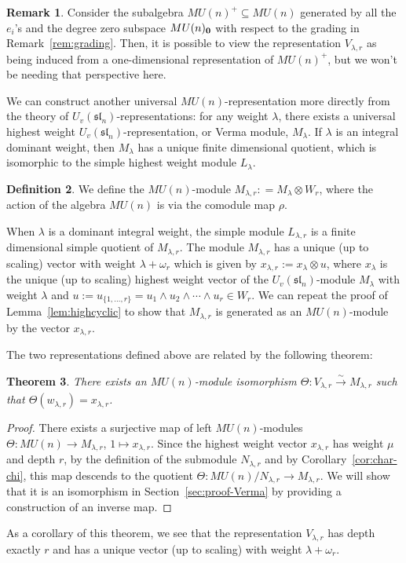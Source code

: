 \documentclass{amsart}
\numberwithin{equation}{section}
\theoremstyle{theorem}
\newtheorem{theorem}{Theorem}[section]
\theoremstyle{definition}
\newtheorem{remark}[theorem]{Remark}
\newtheorem{definition}[theorem]{Definition}
\newcommand{\sub}{\subseteq}
\newcommand{\sll}{\mathfrak{sl}}
\newcommand{\xra}{\xrightarrow[]}
\newcommand{\uvsln}{U_v(\sll_n)}
\begin{document}
\begin{remark}
Consider the subalgebra $MU(n)^+\sub MU(n)$ generated by all the $e_i$'s and the degree zero subspace $MU(n)_{\bold{0}}$ with respect to the grading in Remark~\ref{rem:grading}. Then, it is possible to view the representation $V_{\lambda, r}$ as being induced from a one-dimensional representation of $MU(n)^+$, but we won't be needing that perspective here.
\end{remark}

We can construct another universal $MU(n)$-representation more directly from the theory of $\uvsln$-representations: for any weight $\lambda$, there exists a universal highest weight $\uvsln$-representation, or Verma module, $M_{\lambda}$. If $\lambda$ is an integral dominant weight, then $M_{\lambda}$ %
has a unique finite dimensional quotient, which is isomorphic to %
the simple highest weight module $L_{\lambda}$.%

\begin{definition}
We define the $MU(n)$-module $M_{\lambda,r}: = M_{\lambda} \otimes W_r$, where the action of the algebra $MU(n)$ is via the comodule map $\rho$.
\end{definition}
When $\lambda$ is a dominant integral weight, the simple module $L_{\lambda, r}$ is a finite dimensional simple quotient of $M_{\lambda,r}$. The module $M_{\lambda,r}$ has a unique (up to scaling) vector with weight $\lambda+\omega_r$ which is given by $x_{\lambda,r}:=x_{\lambda}\otimes u$, where $x_{\lambda}$ is the unique (up to scaling) highest weight vector of the $\uvsln$-module $M_{\lambda}$ with weight $\lambda$ and $u:=u_{\{1,\ldots,r\}}=u_1\wedge u_2\wedge\cdots\wedge u_r \in W_r$. We can repeat the proof of Lemma~\ref{lem:highcyclic} to show that $M_{\lambda,r}$ is generated as an $MU(n)$-module by the vector $x_{\lambda,r}$.

The two representations defined above are related by the following theorem:
\begin{theorem} \label{prop:Verma}
There exists an $MU(n)$-module isomorphism $\Theta: V_{\lambda,r} \xra{\sim} M_{\lambda,r}$ such that $\Theta(w_{\lambda,r})=x_{\lambda,r}$.
\end{theorem}
\begin{proof}
There exists a surjective map of left $MU(n)$-modules $\Theta:MU(n)\to M_{\lambda,r}$, $1\mapsto x_{\lambda,r}$. Since the highest weight vector $x_{\lambda,r}$ has weight $\mu$ and depth $r$, by the definition of the submodule $N_{\lambda, r}$ and by Corollary~\ref{cor:char-chi}, this map descends to the quotient $\Theta:MU(n)/N_{\lambda, r}\to M_{\lambda,r}$. We will show that it is an isomorphism in Section~\ref{sec:proof-Verma} by providing a construction of an inverse map.
\end{proof}
As a corollary of this theorem, we see that the representation $V_{\lambda,r}$ has depth exactly $r$ and has a unique vector (up to scaling) with weight $\lambda+\omega_r$.
\end{document}
